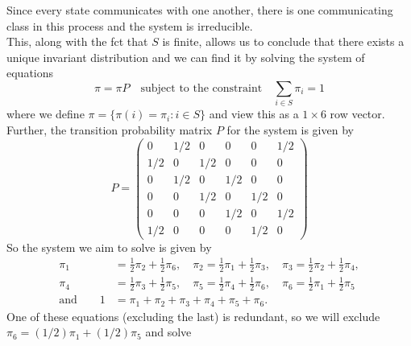 \documentclass[11pt, letterpaper]{article}
\begin{document}
    Since every state communicates with one another, there is one communicating class in this process and the system is irreducible.\\[10pt]
    This, along with the fct that $S$ is finite, allows us to conclude that there exists a unique invariant distribution and we can find it by solving
    the system of equations
    \[\pi=\pi P\quad\text{subject to the constraint}\quad \sum_{i\in S}\pi_i=1\]
    where we define $\pi=\{\pi(i)=\pi_i:i\in S\}$ and view this as a $1\times 6$ row vector. Further, the transition probability matrix $P$ for the system is given by
    \[P=\begin{pmatrix}
       0 & 1/2 & 0 & 0 & 0 & 1/2\\
       1/2 & 0 & 1/2 & 0 & 0 & 0\\
       0 & 1/2 & 0 & 1/2 & 0 & 0\\
       0 & 0 & 1/2 & 0 & 1/2 & 0\\
       0 & 0 & 0 & 1/2 & 0 & 1/2\\
       1/2 & 0 & 0 & 0 & 1/2 & 0 
    \end{pmatrix}\]
    So the system we aim to solve is given by
    \begin{align*}
        \pi_1 &= \frac{1}{2}\pi_2 + \frac{1}{2}\pi_6,\quad
        \pi_2 = \frac{1}{2}\pi_1 + \frac{1}{2}\pi_3,\quad
        \pi_3 = \frac{1}{2}\pi_2 + \frac{1}{2}\pi_4,\\
        \pi_4 &= \frac{1}{2}\pi_3 + \frac{1}{2}\pi_5,\quad
        \pi_5 = \frac{1}{2}\pi_4 + \frac{1}{2}\pi_6,\quad
        \pi_6 = \frac{1}{2}\pi_1 + \frac{1}{2}\pi_5\\
        \text{and}\qquad 1&=\pi_1+\pi_2+\pi_3+\pi_4+\pi_5+\pi_6.
    \end{align*}
    One of these equations (excluding the last) is redundant, so we will exclude $\pi_6=(1/2)\pi_1+(1/2)\pi_5$ and solve
\end{document}
